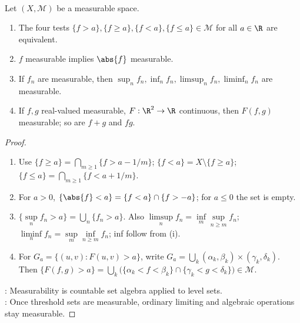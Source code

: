\begin{theorem} \label{thm:measurable-function-closure} \\
Let $(X,\mathcal{M})$ be a measurable space.
\begin{enumerate}[label=(\roman*)]
\setlength{\itemsep}{0pt}
\item The four tests $\{f>a\},\{f\geq a\},\{f<a\},\{f\leq a\}\in\mathcal{M}$ for all $a\in\R$ are equivalent.
\item $f$ measurable implies $\abs{f}$ measurable.
\item If $f_n$ are measurable, then $\sup_nf_n,\inf_nf_n,\limsup_nf_n,\liminf_nf_n$ are measurable.
\item If $f,g$ real-valued measurable, $F:\R^2\to\R$ continuous, then $F(f,g)$ measurable; so are $f+g$ and $fg$.
\end{enumerate}
\begin{proof}
\begin{enumerate}[label=(\roman*)]
\setlength{\itemsep}{0pt}
\item Use $\{f\geq a\}=\bigcap\limits_{m\geq1}\{f>a-1/m\}$; $\{f<a\}=X\setminus\{f\geq a\}$; $\{f\leq a\}=\bigcap\limits_{m\geq1}\{f<a+1/m\}$.
\item For $a>0$, $\{\abs{f}<a\}=\{f<a\}\cap\{f>-a\}$; for $a\leq0$ the set is empty.
\item $\{\sup\limits_nf_n>a\}=\bigcup\limits_n\{f_n>a\}$. Also $\limsup\limits_nf_n=\inf\limits_m\sup\limits_{n\geq m}f_n$; $\liminf\limits_nf_n=\sup\limits_m\inf\limits_{n\geq m}f_n$; inf follow from (i).
\item For $G_a=\{(u,v):F(u,v)>a\}$, write $G_a=\bigcup\limits_k(\alpha_k,\beta_k)\times(\gamma_k,\delta_k)$.\\
Then $\{F(f,g)>a\}=\bigcup\limits_k\bigl(\{\alpha_k<f<\beta_k\}\cap\{\gamma_k<g<\delta_k\}\bigr)\in\mathcal{M}$.
\end{enumerate}
: Measurability is countable set algebra applied to level sets.\\
: Once threshold sets are measurable, ordinary limiting and algebraic operations stay measurable.
\end{proof}
\end{theorem}

